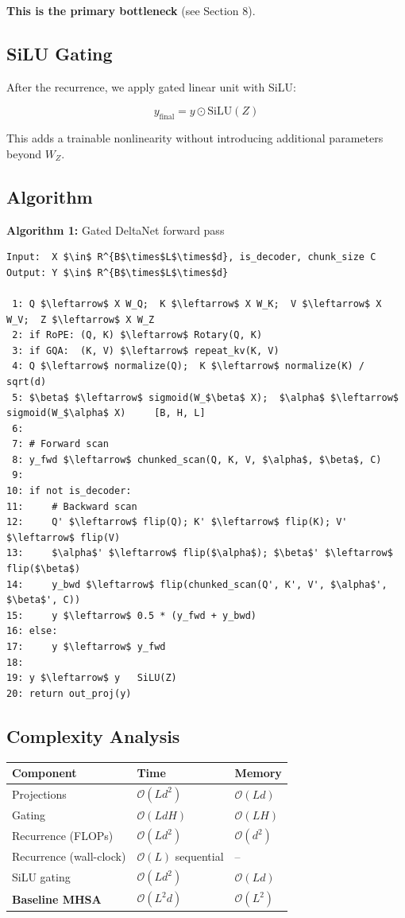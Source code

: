 \textbf{This is the primary bottleneck} (see Section 8).

\subsection{SiLU Gating}

After the recurrence, we apply gated linear unit with SiLU:

\[
y_\text{final} = y \odot \text{SiLU}(Z)
\tag{4.9}
\]

This adds a trainable nonlinearity without introducing additional parameters 
beyond $W_Z$.

\subsection{Algorithm}

\textbf{Algorithm 1:} Gated DeltaNet forward pass
\begin{lstlisting}
Input:  X $\in$ R^{B$\times$L$\times$d}, is_decoder, chunk_size C
Output: Y $\in$ R^{B$\times$L$\times$d}

 1: Q $\leftarrow$ X W_Q;  K $\leftarrow$ X W_K;  V $\leftarrow$ X W_V;  Z $\leftarrow$ X W_Z
 2: if RoPE: (Q, K) $\leftarrow$ Rotary(Q, K)
 3: if GQA:  (K, V) $\leftarrow$ repeat_kv(K, V)
 4: Q $\leftarrow$ normalize(Q);  K $\leftarrow$ normalize(K) / sqrt(d)
 5: $\beta$ $\leftarrow$ sigmoid(W_$\beta$ X);  $\alpha$ $\leftarrow$ sigmoid(W_$\alpha$ X)     [B, H, L]
 6:
 7: # Forward scan
 8: y_fwd $\leftarrow$ chunked_scan(Q, K, V, $\alpha$, $\beta$, C)
 9:
10: if not is_decoder:
11:     # Backward scan
12:     Q' $\leftarrow$ flip(Q); K' $\leftarrow$ flip(K); V' $\leftarrow$ flip(V)
13:     $\alpha$' $\leftarrow$ flip($\alpha$); $\beta$' $\leftarrow$ flip($\beta$)
14:     y_bwd $\leftarrow$ flip(chunked_scan(Q', K', V', $\alpha$', $\beta$', C))
15:     y $\leftarrow$ 0.5 * (y_fwd + y_bwd)
16: else:
17:     y $\leftarrow$ y_fwd
18:
19: y $\leftarrow$ y   SiLU(Z)
20: return out_proj(y)
\end{lstlisting}

\subsection{Complexity Analysis}

\begin{table}[H]
\centering
\small
\begin{tabular}{lll}
\toprule
\textbf{Component} & \textbf{Time} & \textbf{Memory} \\
\midrule
Projections & $\mathcal{O}(Ld^2)$ & $\mathcal{O}(Ld)$ \\
Gating & $\mathcal{O}(LdH)$ & $\mathcal{O}(LH)$ \\
Recurrence (FLOPs) & $\mathcal{O}(Ld^2)$ & $\mathcal{O}(d^2)$ \\
Recurrence (wall-clock) & $\mathcal{O}(L)$ sequential & -- \\
SiLU gating & $\mathcal{O}(Ld^2)$ & $\mathcal{O}(Ld)$ \\
\textbf{Baseline MHSA} & $\mathcal{O}(L^2 d)$ & $\mathcal{O}(L^2)$ \\
\bottomrule
\end{tabular}
\end{table}

